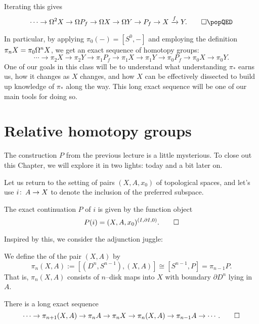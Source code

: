 \begin{lemma}\label{LexseqInvolvingP}\pushQED{\qed}%
Iterating this gives \[\cdots \to \Loops^2 X \to \Loops P_f \to \Loops X \to \Loops Y \to P_f \to X \xrightarrow f Y. \qedhere \popQED\]
\end{lemma}

In particular, by applying $\pi_0(-) = [S^0, -]$ and employing the definition $\pi_n X = \pi_0 \Omega^n X$, we get an exact sequence of homotopy groups: \[\cdots \to \pi_2 X \to \pi_2 Y \to \pi_1 P_f \to \pi_1 X \to \pi_1 Y \to \pi_0 P_f \to \pi_0 X \to \pi_0 Y.\]
One of our goals in this class will be to understand what understanding $\pi_*$ earns us, how it changes as $X$ changes, and how $X$ can be effectively dissected to build up knowledge of $\pi_*$ along the way.
This long exact sequence will be one of our main tools for doing so.




\section{Relative homotopy groups}

The construction $P$ from the previous lecture is a little mysterious.
To close out this Chapter, we will explore it in two lights: today and a bit later on.

Let us return to the setting of pairs $(X, A, x_0)$ of topological spaces, and let's use $i\colon\thinspace A \to X$ to denote the inclusion of the preferred subspace.

\begin{lemma}
The exact continuation $P$ of $i$ is given by the function object \[P(i) = (X, A, x_0)^{(I, \partial I, 0)}. \qed\]
\end{lemma}

Inspired by this, we consider the adjunction juggle:

\begin{definition}
We define the  of the pair $(X, A)$ by \[\pi_n(X, A) := [(D^n, S^{n-1}), (X, A)] \cong [S^{n-1}, P] = \pi_{n-1} P.\]
That is, $\pi_n(X, A)$ consists of $n$--disk maps into $X$ with boundary $\partial D^n$ lying in $A$.
\end{definition}

\begin{corollary}\label{LexseqOfRelativeHtpy}%
There is a long exact sequence \[\cdots \to \pi_{n+1}(X, A) \to \pi_n A \to \pi_n X \to \pi_n (X, A) \to \pi_{n-1} A \to \cdots. \qed\]
\end{corollary}

